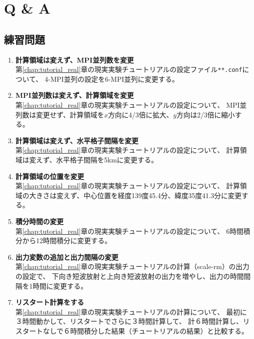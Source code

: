 \chapter{Q \& A} \label{chap:practice}

\section*{練習問題}

\begin{enumerate}
\item {\bf 計算領域は変えず、MPI並列数を変更}\\
第\ref{chap:tutorial_real}章の現実実験チュートリアルの設定ファイル\verb|**.conf|について、
4-MPI並列の設定を6-MPI並列に変更する。

\item {\bf MPI並列数は変えず、計算領域を変更}\\
第\ref{chap:tutorial_real}章の現実実験チュートリアルの設定について、
MPI並列数は変更せず、計算領域を$x$方向に4/3倍に拡大、$y$方向は2/3倍に縮小する。

\item {\bf 計算領域は変えず、水平格子間隔を変更}\\
第\ref{chap:tutorial_real}章の現実実験チュートリアルの設定について、
計算領域は変えず、水平格子間隔を5kmに変更する。

\item {\bf 計算領域の位置を変更}\\
第\ref{chap:tutorial_real}章の現実実験チュートリアルの設定について、
計算領域の大きさは変えず、中心位置を経度139度45.4分、緯度35度41.3分に変更する。

\item {\bf 積分時間の変更}\\
第\ref{chap:tutorial_real}章の現実実験チュートリアルの設定について、
6時間積分から12時間積分に変更する。

\item {\bf 出力変数の追加と出力間隔の変更}\\
第\ref{chap:tutorial_real}章の現実実験チュートリアルの計算（scale-rm）の出力の設定で、
下向き短波放射と上向き短波放射の出力を増やし、出力の時間間隔を1時間に変更する。

\item {\bf リスタート計算をする}\\
第\ref{chap:tutorial_real}章の現実実験チュートリアルの計算について、
最初に３時間動かして、リスタートでさらに３時間計算して、
計６時間計算し、リスタートなしで６時間積分した結果（チュートリアルの結果）と比較する。





\end{enumerate}

